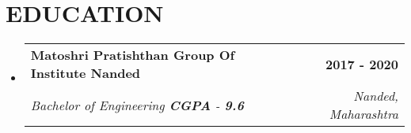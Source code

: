 \documentclass[letterpaper,11pt]{article}
\makeatletter
\newcommand{\resumeItem}[1]{
  \item\small{
    {#1 \vspace{-2pt}}
  }
}
\newcommand{\resumeSubheading}[4]{
  \vspace{-2pt}\item
    \begin{tabular*}{1.0\textwidth}[t]{l@{\extracolsep{\fill}}r}
      \textbf{\large#1} & \textbf{\small #2} \\
      \textit{\large#3} & \textit{\small #4} \\
      
    \end{tabular*}\vspace{-7pt}
}
\newcommand{\resumeSubHeadingListStart}{\begin{itemize}[leftmargin=0.0in, label={}]}
\newcommand{\resumeSubHeadingListEnd}{\end{itemize}}
\newcommand{\resumeItemListStart}{\begin{itemize}}
\newcommand{\resumeItemListEnd}{\end{itemize}\vspace{-5pt}}
\makeatother
\begin{document}
\section{EDUCATION}
  \resumeSubHeadingListStart
    \resumeSubheading
      {Matoshri Pratishthan Group Of Institute Nanded}{2017 - 2020}
      {Bachelor of Engineering  \textbf{CGPA} - \textbf{9.6}}{Nanded, Maharashtra}
  \resumeSubHeadingListEnd
  




  
\end{document}
